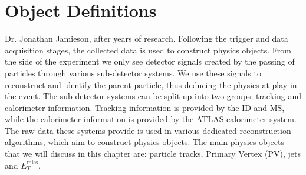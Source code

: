 \chapter{Object Definitions}
\label{chap::objects}
{Dr. Jonathan Jamieson, after years of research.}
Following the trigger and data acquisition stages, the collected data is used to construct physics objects. From the side of the experiment we only see detector signals created by the passing of particles through various sub-detector systems. We use these signals to reconstruct and identify the parent particle, thus deducing the physics at play in the event. The sub-detector systems can be split up into two groups: tracking and calorimeter information. Tracking information is provided by the ID and MS, while the calorimeter information is provided by the ATLAS calorimeter system. The raw data these systems provide is used in various dedicated reconstruction algorithms, which aim to construct physics objects. The main physics objects that we will discuss in this chapter are: particle tracks, Primary Vertex (PV), jets and $E_{T}^{\text{miss}}$.

